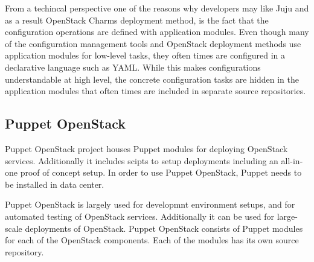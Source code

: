 \documentclass[officiallayout]{tktla}
\begin{document}
From a techincal perspective one of the reasons why developers may like Juju
and as a result OpenStack Charms deployment method, is the fact that the
configuration operations are defined with application modules. Even though many
of the configuration management tools and OpenStack deployment methods use
application modules for low-level tasks, they often times are configured in a
declarative language such as YAML. While this makes configurations
understandable at high level, the concrete configuration tasks are hidden in
the application modules that often times are included in separate source
repositories.

\subsection{Puppet OpenStack}

Puppet OpenStack project houses Puppet \cite{puppet-deployment-guide} modules
for deploying OpenStack services. Additionally it includes scipts to setup
deployments including an all-in-one proof of concept setup. In order to use
Puppet OpenStack, Puppet needs to be installed in data center.

Puppet OpenStack is largely used for developmnt environment setups, and for
automated testing of OpenStack services. Additionally it can be used for
large-scale deployments of OpenStack. Puppet OpenStack consists of Puppet
modules for each of the OpenStack components. Each of the modules has its own
source repository.
\end{document}
